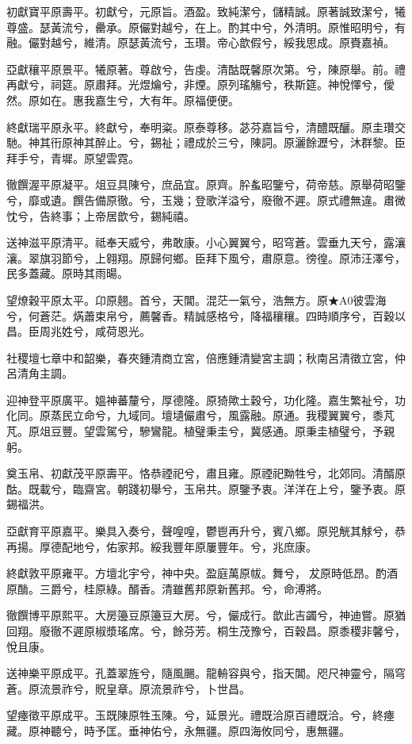 \begin{pinyinscope}
初獻寶平原壽平。初獻兮，元原旨。酒盈。致純潔兮，儲精誠。原著誠致潔兮，犧尊盛。瑟黃流兮，罍承。原儼對越兮，在上。酌其中兮，外清明。原惟昭明兮，有融。儼對越兮，維清。原瑟黃流兮，玉瓚。帝心歆假兮，綏我思成。原賚嘉禎。

亞獻穰平原景平。犧原著。尊啟兮，告虔。清酤既馨原次第。兮，陳原舉。前。禮再獻兮，祠筵。原肅拜。光煜爚兮，非煙。原列瑤觴兮，秩斯筵。神悅懌兮，僾然。原如在。惠我嘉生兮，大有年。原福便便。

終獻瑞平原永平。終獻兮，奉明粢。原泰尊移。苾芬嘉旨兮，清醴既釃。原圭瓚交馳。神其衎原神其醉止。兮，錫祉；禮成於三兮，陳詞。原灑餘瀝兮，沐群黎。臣拜手兮，青墀。原望雲霓。

徹饌渥平原凝平。俎豆具陳兮，庶品宜。原齊。肸蚃昭鑒兮，荷帝慈。原舉荷昭鑒兮，靡或遺。饌告備原徹。兮，玉幾；登歌洋溢兮，廢徹不遲。原式禮無違。肅微忱兮，告終事；上帝居歆兮，錫純禧。

送神滋平原清平。祗奉天威兮，弗敢康。小心翼翼兮，昭穹蒼。雲垂九天兮，露瀼瀼。翠旗羽節兮，上翱翔。原歸何鄉。臣拜下風兮，肅原意。徬徨。原沛汪澤兮，民多蓋藏。原時其雨暘。

望燎穀平原太平。卬原翹。首兮，天閶。混茫一氣兮，浩無方。原★A0彼雲海兮，何蒼茫。焫蕭束帛兮，薦馨香。精誠感格兮，降福穰穰。四時順序兮，百穀以昌。臣周兆姓兮，咸荷恩光。

社稷壇七章中和韶樂，春夾鍾清商立宮，倍應鍾清變宮主調；秋南呂清徵立宮，仲呂清角主調。

迎神登平原廣平。媼神蕃釐兮，厚德隆。原猗歟土穀兮，功化隆。嘉生繁祉兮，功化同。原蒸民立命兮，九域同。壇壝儼肅兮，風露融。原通。我稷翼翼兮，黍芃芃。原俎豆豐。望雲駕兮，驂鸞龍。植璧秉圭兮，冀感通。原秉圭植璧兮，予親躬。

奠玉帛、初獻茂平原壽平。恪恭禋祀兮，肅且雍。原禋祀黝牲兮，北郊同。清醑原酤。既載兮，臨齋宮。朝踐初舉兮，玉帛共。原鑒予衷。洋洋在上兮，鑒予衷。原錫福洪。

亞獻育平原嘉平。樂具入奏兮，聲喤喤，鬱鬯再升兮，賓八鄉。原兕觥其觩兮，恭再揚。厚德配地兮，佑家邦。綏我豐年原屢豐年。兮，兆庶康。

終獻敦平原雍平。方壇北宇兮，神中央。盈庭萬原帗。舞兮，犮原時低昂。酌酒原酳。三爵兮，桂原綠。醑香。清雖舊邦原新舊邦。兮，命溥將。

徹饌博平原熙平。大房籩豆原籩豆大房。兮，儼成行。歆此吉蠲兮，神迪嘗。原猶回翔。廢徹不遲原椒漿瑤席。兮，餘芬芳。桐生茂豫兮，百穀昌。原黍稷非馨兮，悅且康。

送神樂平原成平。孔蓋翠旌兮，隨風颺。龍輈容與兮，指天閶。咫尺神靈兮，隔穹蒼。原流景祚兮，貺皇章。原流景祚兮，卜世昌。

望瘞徵平原成平。玉既陳原牲玉陳。兮，延景光。禮既洽原百禮既洽。兮，終瘞藏。原神聽兮，時予匡。垂神佑兮，永無疆。原四海攸同兮，惠無疆。


\end{pinyinscope}
